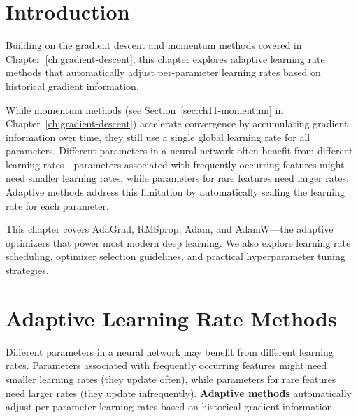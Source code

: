 \documentclass[../../main.tex]{subfiles}
\begin{document}
\section{Introduction}
\label{sec:adv-opt-intro}

Building on the gradient descent and momentum methods covered in Chapter~\ref{ch:gradient-descent}, this chapter explores adaptive learning rate methods that automatically adjust per-parameter learning rates based on historical gradient information.

While momentum methods (see Section~\ref{sec:ch11-momentum} in Chapter~\ref{ch:gradient-descent}) accelerate convergence by accumulating gradient information over time, they still use a single global learning rate for all parameters. Different parameters in a neural network often benefit from different learning rates---parameters associated with frequently occurring features might need smaller learning rates, while parameters for rare features need larger rates. Adaptive methods address this limitation by automatically scaling the learning rate for each parameter.

This chapter covers AdaGrad, RMSprop, Adam, and AdamW---the adaptive optimizers that power most modern deep learning. We also explore learning rate scheduling, optimizer selection guidelines, and practical hyperparameter tuning strategies.

\section{Adaptive Learning Rate Methods}
\label{sec:adaptive-lr}

Different parameters in a neural network may benefit from different learning rates. Parameters associated with frequently occurring features might need smaller learning rates (they update often), while parameters for rare features need larger rates (they update infrequently). \textbf{Adaptive methods} automatically adjust per-parameter learning rates based on historical gradient information.
\end{document}
